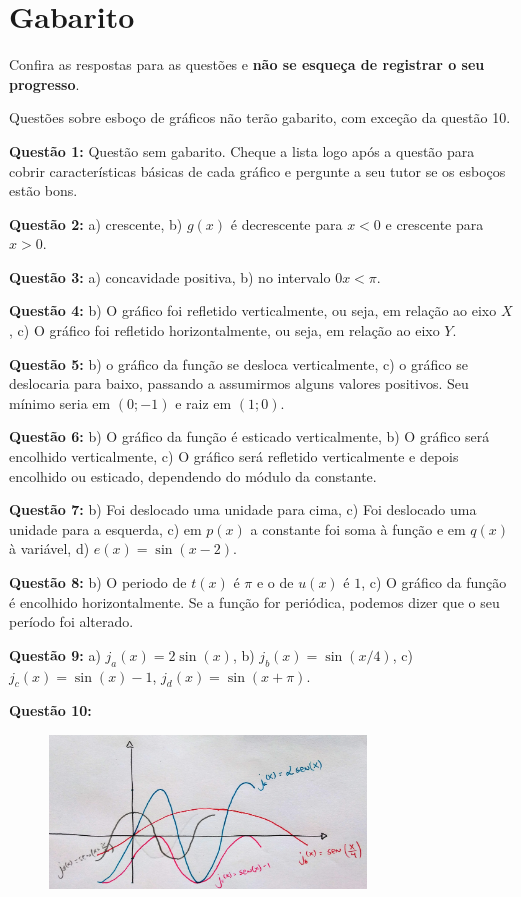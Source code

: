 \documentclass[main_estudante.tex]{subfiles}
\begin{document}
\section{Gabarito}

Confira as respostas para as questões e \textbf{não se esqueça de registrar o seu progresso}.

Questões sobre esboço de gráficos não terão gabarito, com exceção da questão 10.

\noindent\textbf{Questão 1:} Questão sem gabarito. Cheque a lista logo após a questão para cobrir características básicas de cada gráfico e pergunte a seu tutor se os esboços estão bons.

\noindent\textbf{Questão 2:} a) crescente, b) $g(x)$ é decrescente para $x<0$ e crescente para $x>0$.

\noindent\textbf{Questão 3:} a) concavidade positiva, b) no intervalo $0x<\pi$.

\noindent\textbf{Questão 4:} b) O gráfico foi refletido verticalmente, ou seja, em relação ao eixo $X$, c) O gráfico foi refletido horizontalmente, ou seja, em relação ao eixo $Y$.

\noindent\textbf{Questão 5:} b) o gráfico da função se desloca verticalmente, c) o gráfico se deslocaria para baixo, passando a assumirmos alguns valores positivos. Seu mínimo seria em $(0;-1)$ e raiz em $(1;0)$.

\noindent\textbf{Questão 6:} b) O gráfico da função é esticado verticalmente, b) O gráfico será encolhido verticalmente, c) O gráfico será refletido verticalmente e depois encolhido ou esticado, dependendo do módulo da constante.

\noindent\textbf{Questão 7:} b) Foi deslocado uma unidade para cima, c) Foi deslocado uma unidade para a esquerda, c) em $p(x)$ a constante foi soma à função e em $q(x)$ à variável, d) $e(x)=\sin(x-2)$.

\noindent\textbf{Questão 8:} b) O periodo de $t(x)$ é $\pi$ e o de $u(x)$ é $1$, c) O gráfico da função é encolhido horizontalmente. Se a função for periódica, podemos dizer que o seu período foi alterado.

\noindent\textbf{Questão 9:} a) $j_a(x)=2\sin(x)$, b) $j_b(x)=\sin(x/4)$, c)$j_c(x)=\sin(x)-1$, $j_d(x)=\sin(x+\pi)$.

\noindent\textbf{Questão 10:}

\begin{figure}[h]
\centering
\includegraphics[width=0.75\textwidth]{./img/c7g10.jpg}
\end{figure}
\end{document}
